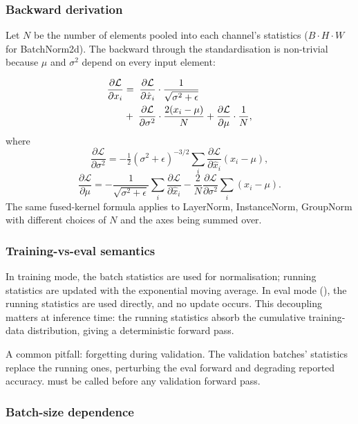 \subsubsection*{Backward derivation}

Let $N$ be the number of elements pooled into each channel's
statistics ($B \cdot H \cdot W$ for BatchNorm2d). The
backward through the standardisation is non-trivial because
$\mu$ and $\sigma^2$ depend on every input element:

\begin{align}
  \frac{\partial \mathcal{L}}{\partial x_i}
  &=\;
  \frac{\partial \mathcal{L}}{\partial \hat x_i} \cdot
  \frac{1}{\sqrt{\sigma^2 + \epsilon}} \notag \\
  &+\; \frac{\partial \mathcal{L}}{\partial \sigma^2}
  \cdot \frac{2(x_i - \mu)}{N}
  + \frac{\partial \mathcal{L}}{\partial \mu} \cdot \frac{1}{N},
\end{align}
where
\[
  \frac{\partial \mathcal{L}}{\partial \sigma^2}
  = -\tfrac{1}{2} (\sigma^2 + \epsilon)^{-3/2}
  \sum_i \frac{\partial \mathcal{L}}{\partial \hat x_i}(x_i - \mu),
\]
\[
  \frac{\partial \mathcal{L}}{\partial \mu}
  = -\frac{1}{\sqrt{\sigma^2 + \epsilon}}
  \sum_i \frac{\partial \mathcal{L}}{\partial \hat x_i}
  - \frac{2}{N} \frac{\partial \mathcal{L}}{\partial \sigma^2}
  \sum_i (x_i - \mu).
\]
The same fused-kernel formula applies to LayerNorm,
InstanceNorm, GroupNorm with different choices of $N$ and the
axes being summed over.

\subsubsection*{Training-vs-eval semantics}

In training mode, the batch statistics are used for
normalisation; running statistics are updated with the
exponential moving average. In eval mode (),
the running statistics are used directly, and no update
occurs. This decoupling matters at inference time: the
running statistics absorb the cumulative training-data
distribution, giving a deterministic forward pass.

A common pitfall: forgetting  during
validation. The validation batches' statistics replace the
running ones, perturbing the eval forward and degrading
reported accuracy.  must be called before
any validation forward pass.

\subsubsection*{Batch-size dependence}

